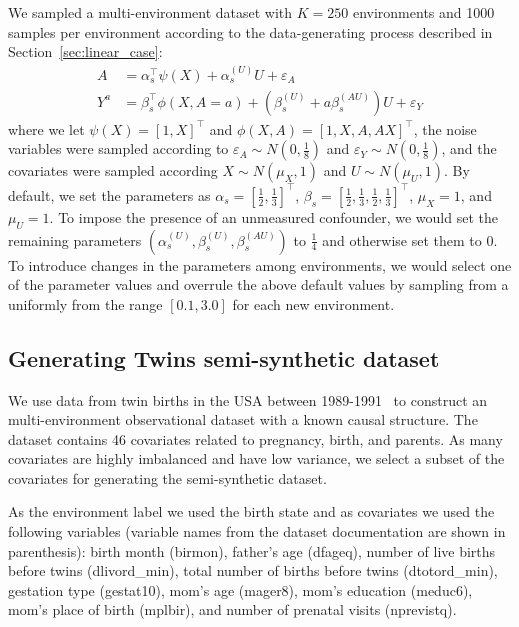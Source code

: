 \documentclass{article}
\begin{document}
We sampled a multi-environment dataset with $K=250$ environments and 1000 samples per environment according to the data-generating process described in Section~\ref{sec:linear_case}:
\begin{equation}
    \begin{aligned}
        A &= \alpha_s^\top \psi(X) + \alpha_{s}^{(U)} U + \varepsilon_A \\
        Y^a &= \beta_s^\top \phi(X,A=a) + \left(\beta_s^{(U)} + a\beta_s^{(AU)}\right) U + \varepsilon_Y
    \end{aligned}
\end{equation}
where we let $\psi(X)=[1,X]^\top$ and $\phi(X,A) = [1,X,A,AX]^\top$, the noise variables were sampled according to $\varepsilon_A\sim N(0,\frac{1}{8})$ and $\varepsilon_Y\sim N(0,\frac{1}{8})$, and the covariates were sampled according $X\sim N(\mu_X, 1)$ and $U\sim N(\mu_U,1)$. By default,  we set the parameters as $\alpha_s=[\frac{1}{2}, \frac{1}{3}]^\top$, $\beta_s=[\frac{1}{2}, \frac{1}{3}, \frac{1}{2}, \frac{1}{3}]^\top$, $\mu_X=1$, and $\mu_U=1$. To impose the presence of an unmeasured confounder, we would set the remaining parameters  $(\alpha_s^{(U)}, \beta_s^{(U)},\beta_s^{(AU)})$ to $\frac{1}{4}$ and otherwise set them to 0. To introduce changes in the parameters among environments, we would select one of the parameter values and overrule the above default values by sampling from a uniformly from the range $[0.1, 3.0]$ for each new environment.

\subsection{Generating Twins semi-synthetic dataset} \label{app:twins_data}
We use data from twin births in the USA between 1989-1991~\citep{almond2005costs} to construct an multi-environment observational dataset with a known causal structure. The dataset contains 46 covariates related to pregnancy, birth, and parents. As many covariates are highly imbalanced and have low variance, we select a subset of the covariates for generating the semi-synthetic dataset. 

As the environment label we used the birth state and as covariates we used the following variables (variable names from the dataset documentation are shown in parenthesis): birth month (birmon), father's age (dfageq), number of live births before twins (dlivord\_min),  total number of births before twins (dtotord\_min), gestation type (gestat10),  mom's age (mager8), mom's education (meduc6), mom's place of birth (mplbir), and number of prenatal visits (nprevistq).
\end{document}
